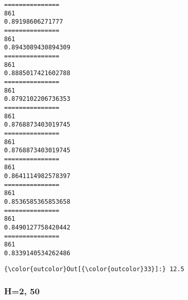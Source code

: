 \documentclass[11pt]{article}
\begin{document}
    \begin{Verbatim}[commandchars=\\\{\}]
===============
861
0.89198606271777
===============
861
0.8943089430894309
===============
861
0.8885017421602788
===============
861
0.8792102206736353
===============
861
0.8768873403019745
===============
861
0.8768873403019745
===============
861
0.8641114982578397
===============
861
0.8536585365853658
===============
861
0.8490127758420442
===============
861
0.8339140534262486

    \end{Verbatim}

\begin{Verbatim}[commandchars=\\\{\}]
{\color{outcolor}Out[{\color{outcolor}33}]:} 12.5
\end{Verbatim}
            
    \subsubsection{H=2, 50}\label{h2-50}
\end{document}
